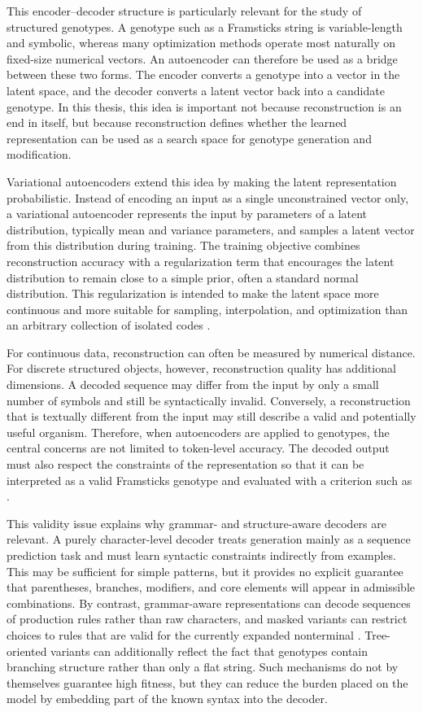 This encoder--decoder structure is particularly relevant for the study of structured genotypes. A genotype such as a Framsticks \fone{} string is variable-length and symbolic, whereas many optimization methods operate most naturally on fixed-size numerical vectors. An autoencoder can therefore be used as a bridge between these two forms. The encoder converts a genotype into a vector in the latent space, and the decoder converts a latent vector back into a candidate genotype. In this thesis, this idea is important not because reconstruction is an end in itself, but because reconstruction defines whether the learned representation can be used as a search space for genotype generation and modification.

Variational autoencoders extend this idea by making the latent representation probabilistic. Instead of encoding an input as a single unconstrained vector only, a variational autoencoder represents the input by parameters of a latent distribution, typically mean and variance parameters, and samples a latent vector from this distribution during training. The training objective combines reconstruction accuracy with a regularization term that encourages the latent distribution to remain close to a simple prior, often a standard normal distribution. This regularization is intended to make the latent space more continuous and more suitable for sampling, interpolation, and optimization than an arbitrary collection of isolated codes \cite{KingmaWelling2014,RezendeMohamedWierstra2014}.

For continuous data, reconstruction can often be measured by numerical distance. For discrete structured objects, however, reconstruction quality has additional dimensions. A decoded sequence may differ from the input by only a small number of symbols and still be syntactically invalid. Conversely, a reconstruction that is textually different from the input may still describe a valid and potentially useful organism. Therefore, when autoencoders are applied to \fone{} genotypes, the central concerns are not limited to token-level accuracy. The decoded output must also respect the constraints of the representation so that it can be interpreted as a valid Framsticks genotype and evaluated with a criterion such as \vertpos{}.

This validity issue explains why grammar- and structure-aware decoders are relevant. A purely character-level decoder treats generation mainly as a sequence prediction task and must learn syntactic constraints indirectly from examples. This may be sufficient for simple patterns, but it provides no explicit guarantee that parentheses, branches, modifiers, and core elements will appear in admissible combinations. By contrast, grammar-aware representations can decode sequences of production rules rather than raw characters, and masked variants can restrict choices to rules that are valid for the currently expanded nonterminal \cite{KusnerPaigeHernandezLobato2017}. Tree-oriented variants can additionally reflect the fact that \fone{} genotypes contain branching structure rather than only a flat string. Such mechanisms do not by themselves guarantee high fitness, but they can reduce the burden placed on the model by embedding part of the known syntax into the decoder.

